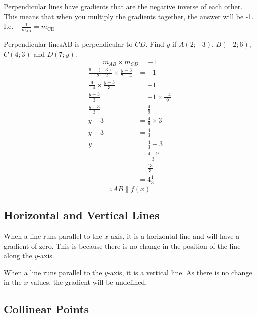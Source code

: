 Perpendicular lines have gradients that are the negative inverse of each other. This means that when you multiply the gradients together, the answer will be -1. I.e. $-\frac{1}{{m}_{\mathrm{AB}}}={m}_{\mathrm{CD}}$

\begin{wex}{Perpendicular lines}{AB is perpendicular to $CD$. Find $y$ if $A(2;-3)$, $B(-2;6)$, $C(4;3)$ and $D(7;y)$.}{
\begin{equation*}
 m_{AB} \times m_{CD} = -1
\end{equation*}
\begin{equation*}
 \begin{array}{rl}
  \frac{6 - (-3)}{-2 -2} \times \frac{y - 3}{7 - 4} &= -1\\
  \frac{9}{-4} \times \frac{y-3}{3} &= -1\\
  \frac{y-3}{3} &= -1 \times \frac{-4}{9}\\
  \frac{y-3}{3} &= \frac{4}{9}\\
  y-3 &= \frac{4}{9} \times 3\\
  y-3 &= \frac{4}{3}\\
  y &= \frac{4}{3} + 3\\
  &= \frac{4 + 9}{3}\\
  &= \frac{13}{3}\\
  &= 4 \frac{1}{3}
 \end{array}
\end{equation*}
\begin{equation*}
 \therefore AB \parallel f(x)
\end{equation*}
}
\end{wex}

\subsection*{Horizontal and Vertical Lines}

When a line runs parallel to the $x$-axis, it is a horizontal line and will have a gradient of zero. This is
because there is no change in the position of the line along the $y$-axis.

When a line runs parallel to the $y$-axis, it is a vertical line. As there is no change in the $x$-values, the
gradient will be undefined.

\subsection*{Collinear Points}

